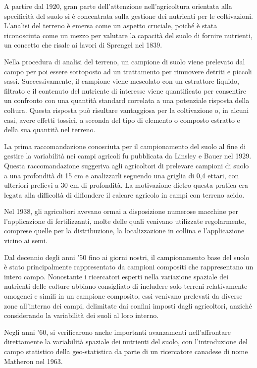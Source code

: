 A partire dal 1920, gran parte dell'attenzione nell'agricoltura orientata alla specificità del suolo si è concentrata sulla gestione dei nutrienti per le coltivazioni. L'analisi del terreno è emersa come un aspetto cruciale, poiché è stata riconosciuta come un mezzo per valutare la capacità del suolo di fornire nutrienti, un concetto che risale ai lavori di Sprengel nel 1839. 

Nella procedura di analisi del terreno, un campione di suolo viene prelevato dal campo per poi essere sottoposto ad un trattamento per rimuovere detriti e piccoli sassi. Successivamente, il campione viene mescolato con un estrattore liquido, filtrato e il contenuto del nutriente di interesse viene quantificato per consentire un confronto con una quantità standard correlata a una potenziale risposta della coltura. Questa risposta può risultare vantaggiosa per la coltivazione o, in alcuni casi, avere effetti tossici, a seconda del tipo di elemento o composto estratto e della sua quantità nel terreno. 

La prima raccomandazione conosciuta per il campionamento del suolo al fine di gestire la variabilità nei campi agricoli fu pubblicata da Linsley e Bauer nel 1929. Questa raccomandazione suggeriva agli agricoltori di prelevare campioni di suolo a una profondità di 15 cm e analizzarli seguendo una griglia di 0,4 ettari, con ulteriori prelievi a 30 cm di profondità. La motivazione dietro questa pratica era legata alla difficoltà di diffondere il calcare agricolo in campi con terreno acido.

Nel 1938, gli agricoltori avevano ormai a disposizione numerose macchine per l'applicazione di fertilizzanti, molte delle quali venivano utilizzate regolarmente, comprese quelle per la distribuzione, la localizzazione in collina e l'applicazione vicino ai semi.

Dal decennio degli anni '50 fino ai giorni nostri, il campionamento base del suolo è stato principalmente rappresentato da campioni compositi che rappresentano un intero campo. Nonostante i ricercatori esperti nella variazione spaziale dei nutrienti delle colture abbiano consigliato di includere solo terreni relativamente omogenei e simili in un campione composito, essi venivano prelevati da diverse zone all'interno dei campi, delimitate dai confini imposti dagli agricoltori, anziché considerando la variabilità dei suoli al loro interno. 

Negli anni '60, si verificarono anche importanti avanzamenti nell'affrontare direttamente la variabilità spaziale dei nutrienti del suolo, con l'introduzione del campo statistico della geo-statistica da parte di un ricercatore canadese di nome Matheron nel 1963.


